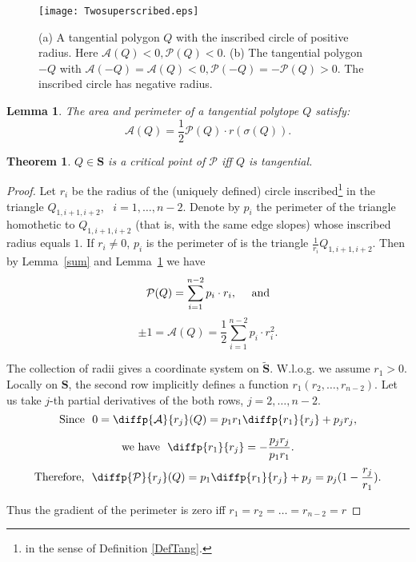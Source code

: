 \documentclass[12pt]{amsart}
\theoremstyle{plain}
\newtheorem{theorem}{Theorem}
\newtheorem{lemma}{Lemma}
\theoremstyle{definition}
\theoremstyle{remark}
\theoremstyle{plain}
\theoremstyle{definition}
\begin{document}
\begin{figure}[h]
\centering \texttt{[image: Twosuperscribed.eps]}
\caption{(a) A tangential polygon $Q$ with the inscribed circle of positive radius. Here $\mathcal{A}(Q)<0, \mathcal{P}(Q)<0$.
(b) The tangential polygon $-Q$ with $\mathcal{A}(-Q)=\mathcal{A}(Q)<0, \mathcal{P}(-Q)=-\mathcal{P}(Q)>0$. The inscribed circle has negative radius. }\label{FigSuperscribed}
\end{figure}

\begin{lemma}\label{APr}
  The area  and perimeter of a tangential polytope $Q$ satisfy:
  $$\mathcal{A}(Q)=\frac12\mathcal{P}(Q)\cdot r(\sigma(Q)).$$

\end{lemma}

\begin{theorem}\label{ThmCritPer}
 \(Q\in\mathbf{S}\) is a critical point of \(\mathcal{P}\) iff $Q$ is tangential.
\end{theorem}



\begin{proof}

Let \(r_i\) be the radius of the (uniquely defined) circle inscribed\footnote{in the sense of Definition \ref{DefTang}.}  in the triangle \(Q_{1,i+1,i+2}\), \ \(i=1,\ldots,n-2\).  Denote by \(p_i\) the perimeter of the triangle homothetic to $Q_{1,i+1,i+2}$ (that is, with the same edge slopes) whose inscribed radius equals $1$. If $r_i\neq 0$, \(p_i\) is the perimeter of is the triangle
 \(\frac{1}{r_i}Q_{1,i+1,i+2}\).
Then by Lemma~\ref{sum} and Lemma~\ref{APr} we have
$$
                                  \mathcal{P}(Q)=\sum_{i=1}^{n-2}p_i\cdot  r_i,  \ \ \ \ \hbox{and}$$
                                 $$ \pm1=\mathcal{A}(Q)=\frac{1}{2}\sum_{i=1}^{n-2}p_i \cdot r_i^2.$$

The collection of radii gives a coordinate system on $\widetilde{\mathbf{S}}$.
W.l.o.g. we assume \(r_1>0\). Locally on $\mathbf{S}$, the second row implicitly defines a function \(r_1(r_2,\ldots,r_{n-2})\). Let us take \(j\)-th partial derivatives of the both rows, \(j=2,\ldots,n-2\).
 $$             \hbox{Since } \         0=\diffp{\mathcal{A}}{{r_j}}(Q)=p_1 r_1\diffp{r_1}{{r_j}}+p_j r_j,
$$

$$ \hbox{we have } \
                                  \diffp{r_1}{{r_j}}=-\frac{p_j r_j}{p_1 r_1} .$$
$$ \hbox{Therefore, } \
                                  \diffp{\mathcal{P}}{{r_j}}(Q)=p_1 \diffp{r_1}{{r_j}}+p_j=p_j(1-\frac{r_j}{r_1}). $$



Thus the gradient of the perimeter is zero iff \(r_1=r_2=\ldots=r_{n-2}=r\)
\end{proof}
\end{document}
